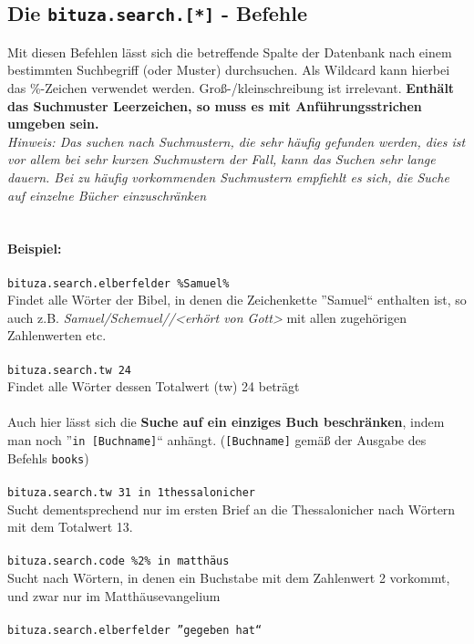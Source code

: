 \documentclass[a4paper]{scrartcl}
\begin{document}
\subsection{Die \texttt{bituza.search.[*]} - Befehle}

Mit diesen Befehlen lässt sich die betreffende Spalte der Datenbank nach einem bestimmten Suchbegriff (oder Muster) durchsuchen.
Als Wildcard kann hierbei das \%-Zeichen verwendet werden. Groß-/kleinschreibung ist irrelevant. \textbf{Enthält das Suchmuster Leerzeichen, so muss es mit Anführungsstrichen umgeben sein.}\\

\textit{Hinweis: Das suchen nach Suchmustern, die sehr häufig gefunden werden, dies ist vor allem bei sehr kurzen Suchmustern der Fall, kann das Suchen sehr lange dauern. Bei zu häufig vorkommenden Suchmustern empfiehlt es sich, die Suche auf einzelne Bücher einzuschränken}\\
\\\\
\textbf{Beispiel:}\\
\\
\texttt{bituza.search.elberfelder \%Samuel\%}\\
Findet alle Wörter der Bibel, in denen die Zeichenkette ''Samuel`` enthalten ist, so auch z.B. \textit{Samuel/Schemuel//<erhört von Gott>} mit allen zugehörigen Zahlenwerten etc.
\\\\
\texttt{bituza.search.tw 24}\\
Findet alle Wörter dessen Totalwert (tw) 24 beträgt
\\\\
Auch hier lässt sich die \textbf{Suche auf ein einziges Buch beschränken}, indem man noch ''\texttt{in [Buchname]}`` anhängt. (\texttt{[Buchname]} gemäß der Ausgabe des Befehls \texttt{books})
\\\\
\texttt{bituza.search.tw 31 in 1thessalonicher}\\
Sucht dementsprechend nur im ersten Brief an die Thessalonicher nach Wörtern mit dem Totalwert 13.
\\\\
\texttt{bituza.search.code \%2\% in matthäus}\\
Sucht nach Wörtern, in denen ein Buchstabe mit dem Zahlenwert 2 vorkommt, und zwar nur im Matthäusevangelium
\\\\
\texttt{bituza.search.elberfelder ''gegeben hat``}\\
\end{document}
